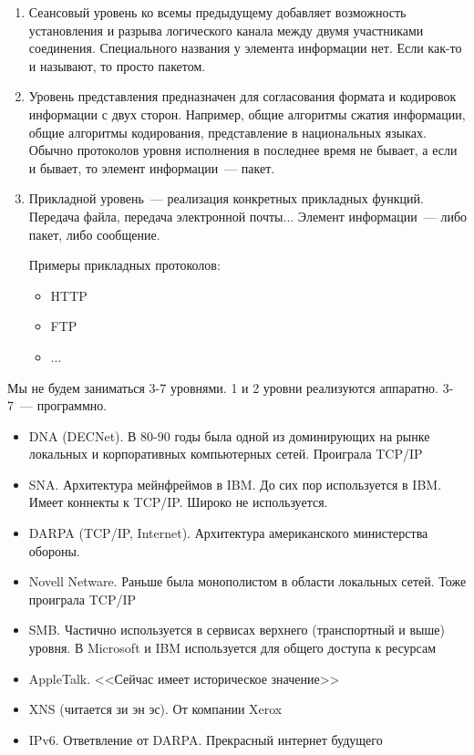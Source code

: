 \begin{enumerate}
\item Сеансовый уровень ко всемы предыдущему добавляет возможность установления и разрыва логического канала между двумя участниками соединения. Специального названия у элемента информации нет. Если как-то и называют, то просто пакетом.

\item Уровень представления предназначен для согласования формата и кодировок информации с двух сторон. Например, общие алгоритмы сжатия информации, общие алгоритмы кодирования, представление в национальных языках. Обычно протоколов уровня исполнения в последнее время не бывает, а если и бывает, то элемент информации~--- пакет.

\item Прикладной уровень~--- реализация конкретных прикладных функций. Передача файла, передача электронной почты... Элемент информации~--- либо пакет, либо сообщение.

Примеры прикладных протоколов:
\begin{itemize}
    \item HTTP
    \item FTP
    \item ...
\end{itemize}

\end{enumerate}

Мы не будем заниматься 3-7 уровнями. 1 и 2 уровни реализуются аппаратно. 3-7~--- программно.


\begin{itemize}
    \item DNA (DECNet). В 80-90 годы была одной из доминирующих на рынке локальных и корпоративных компьютерных сетей. Проиграла TCP/IP
    \item SNA. Архитектура мейнфреймов в IBM. До сих пор используется в IBM. Имеет коннекты к TCP/IP. Широко не используется.
    \item DARPA (TCP/IP, Internet). Архитектура американского министерства обороны. 
    \item Novell Netware. Раньше была монополистом в области локальных сетей. Тоже проиграла TCP/IP
    \item SMB. Частично используется в сервисах верхнего (транспортный и выше) уровня. В Microsoft и IBM используется для общего доступа к ресурсам
    \item AppleTalk. <<Сейчас имеет историческое значение>>
    \item XNS (читается зи эн эс). От компании Xerox
    \item IPv6. Ответвление от DARPA. Прекрасный интернет будущего
\end{itemize}

